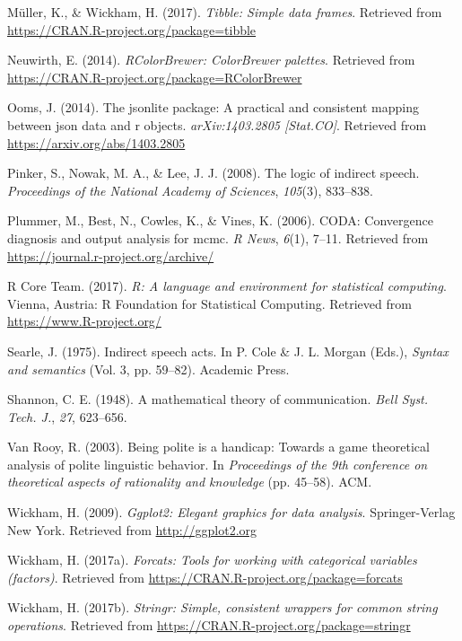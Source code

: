 \documentclass[floatsintext,man]{apa6}
\theoremstyle{definition}
\theoremstyle{definition}
\theoremstyle{definition}
\theoremstyle{remark}
\begin{document}
\hypertarget{ref-R-tibble}{}
Müller, K., \& Wickham, H. (2017). \emph{Tibble: Simple data frames}.
Retrieved from \url{https://CRAN.R-project.org/package=tibble}

\hypertarget{ref-R-RColorBrewer}{}
Neuwirth, E. (2014). \emph{RColorBrewer: ColorBrewer palettes}.
Retrieved from \url{https://CRAN.R-project.org/package=RColorBrewer}

\hypertarget{ref-R-jsonlite}{}
Ooms, J. (2014). The jsonlite package: A practical and consistent
mapping between json data and r objects. \emph{arXiv:1403.2805
{[}Stat.CO{]}}. Retrieved from \url{https://arxiv.org/abs/1403.2805}

\hypertarget{ref-pinker2008}{}
Pinker, S., Nowak, M. A., \& Lee, J. J. (2008). The logic of indirect
speech. \emph{Proceedings of the National Academy of Sciences},
\emph{105}(3), 833--838.

\hypertarget{ref-R-coda}{}
Plummer, M., Best, N., Cowles, K., \& Vines, K. (2006). CODA:
Convergence diagnosis and output analysis for mcmc. \emph{R News},
\emph{6}(1), 7--11. Retrieved from
\url{https://journal.r-project.org/archive/}

\hypertarget{ref-R-base}{}
R Core Team. (2017). \emph{R: A language and environment for statistical
computing}. Vienna, Austria: R Foundation for Statistical Computing.
Retrieved from \url{https://www.R-project.org/}

\hypertarget{ref-searle1975}{}
Searle, J. (1975). Indirect speech acts. In P. Cole \& J. L. Morgan
(Eds.), \emph{Syntax and semantics} (Vol. 3, pp. 59--82). Academic
Press.

\hypertarget{ref-shannon1948}{}
Shannon, C. E. (1948). A mathematical theory of communication.
\emph{Bell Syst. Tech. J.}, \emph{27}, 623--656.

\hypertarget{ref-vanRooy2003}{}
Van Rooy, R. (2003). Being polite is a handicap: Towards a game
theoretical analysis of polite linguistic behavior. In \emph{Proceedings
of the 9th conference on theoretical aspects of rationality and
knowledge} (pp. 45--58). ACM.

\hypertarget{ref-R-ggplot2}{}
Wickham, H. (2009). \emph{Ggplot2: Elegant graphics for data analysis}.
Springer-Verlag New York. Retrieved from \url{http://ggplot2.org}

\hypertarget{ref-R-forcats}{}
Wickham, H. (2017a). \emph{Forcats: Tools for working with categorical
variables (factors)}. Retrieved from
\url{https://CRAN.R-project.org/package=forcats}

\hypertarget{ref-R-stringr}{}
Wickham, H. (2017b). \emph{Stringr: Simple, consistent wrappers for
common string operations}. Retrieved from
\url{https://CRAN.R-project.org/package=stringr}
\end{document}
